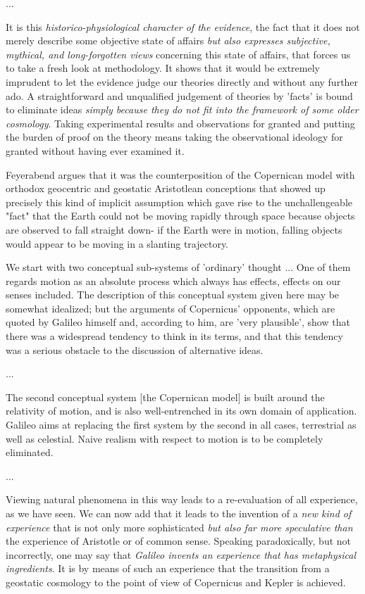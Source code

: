 \begin{longquote}
...

It is this \textit{historico-physiological character of the evidence}, the fact that it
does not merely describe some objective state of affairs \textit{but also
expresses subjective, mythical, and long-forgotten views} concerning this
state of affairs, that forces us to take a fresh look at methodology. It
shows that it would be extremely imprudent to let the evidence judge
our theories directly and without any further ado. A straightforward
and unqualified judgement of theories by 'facts' is bound to eliminate
ideas \textit{simply because they do not fit into the framework of some older
cosmology}. Taking experimental results and observations for granted
and putting the burden of proof on the theory means taking the
observational ideology for granted without having ever examined it.

\cite[p.52]{Feyerabend1993}
\end{longquote}

Feyerabend argues that it was the counterposition of the Copernican model with orthodox geocentric and geostatic Aristotlean conceptions that showed up precisely this kind of implicit assumption which gave rise to the unchallengeable "fact" that the Earth could not be moving rapidly through space because objects are observed to fall straight down- if the Earth were in motion, falling objects would appear to be moving in a slanting trajectory.

\begin{longquote}
We start with two conceptual sub-systems of 'ordinary' thought ... One of them regards motion as an absolute process which always has effects, effects on our senses included.
The description of this conceptual system given here may be somewhat
idealized; but the arguments of Copernicus' opponents, which are
quoted by Galileo himself and, according to him, are 'very
plausible', show that there was a widespread tendency to think in its
terms, and that this tendency was a serious obstacle to the discussion
of alternative ideas.

...

The second conceptual system [the Copernican model] is built around the relativity of
motion, and is also well-entrenched in its own domain of application.
Galileo aims at replacing the first system by the second in all cases,
terrestrial as well as celestial. Naive realism with respect to motion is
to be completely eliminated.

...

Viewing natural phenomena in this way leads to a re-evaluation of all
experience, as we have seen. We can now add that it leads to the
invention of a \textit{new kind of experience} that is not only more sophisticated
\textit{but also far more speculative than} the experience of Aristotle or of
common sense. Speaking paradoxically, but not incorrectly, one may
say that \textit{Galileo invents an experience that has metaphysical ingredients}. It
is by means of such an experience that the transition from a geostatic
cosmology to the point of view of Copernicus and Kepler is
achieved.

\cite[p.69]{Feyerabend1993}
\end{longquote}

